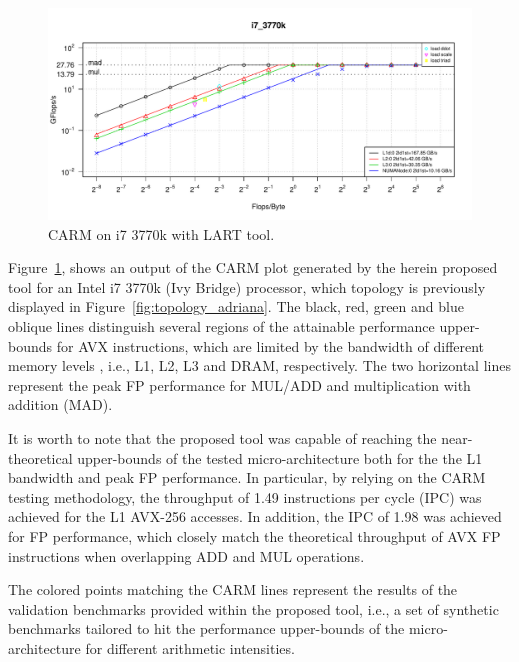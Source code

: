 \documentclass[twoside,twocolumn,8pt]{extarticle}
\begin{document}
\begin{figure}
  \includegraphics[width=\textwidth]{pictures/roofline_model.pdf}
  \caption{CARM on i7 3770k with LART tool.}
  \label{fig:LART_adriana}
\end{figure}

Figure~\ref{fig:LART_adriana}, shows an output of the CARM plot generated by the herein proposed tool for an Intel i7
3770k (Ivy Bridge) processor, which topology is previously displayed in Figure~\ref{fig:topology_adriana}.
The black, red, green and blue oblique lines distinguish several regions of the attainable performance upper-bounds for AVX
instructions, which are limited by the bandwidth of different memory levels , i.e., L1, L2, L3 and DRAM, respectively.
The two horizontal lines represent the peak FP performance for MUL/ADD and multiplication with addition (MAD). 

It is worth to note that the proposed tool was capable of reaching the near-theoretical upper-bounds of the tested
micro-architecture both for the the L1 bandwidth and peak FP performance.  In particular, by relying on the CARM testing
methodology,  the throughput of 1.49 instructions per cycle (IPC) was achieved for the  L1 AVX-256 accesses. In addition, the
IPC of 1.98 was achieved for FP performance, which closely match the theoretical throughput of AVX FP instructions when overlapping
ADD and MUL operations.

The colored points matching the CARM lines represent the results of the validation benchmarks provided within the proposed tool,
i.e., a set of synthetic benchmarks tailored to hit the performance upper-bounds of the micro-architecture for different
arithmetic intensities.
\end{document}
